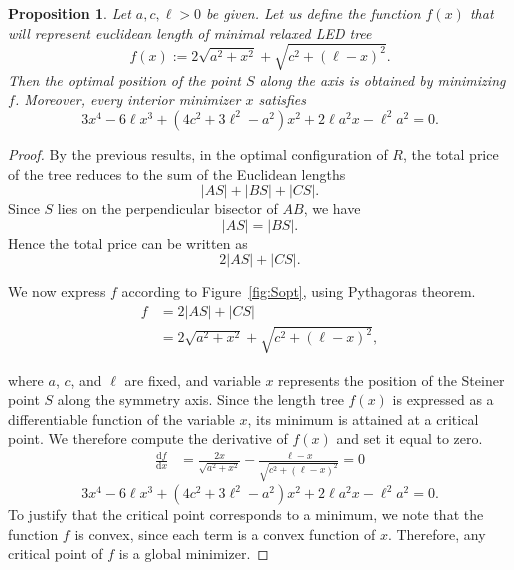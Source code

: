 \documentclass[openany]{book}
\newtheorem{proposition}{Proposition}
\begin{document}
		\begin{proposition}\label{prop:xSopt}
			Let \(a,c,\ell>0\) be given. Let us define the function \(f(x)\) that will represent euclidean length of minimal relaxed LED tree 
			\[
			f(x) := 2\sqrt{a^{2}+x^{2}}+\sqrt{c^{2}+(\ell-x)^{2}} .
			\]
			Then the optimal position of the point \(S\) along the axis is obtained by
			minimizing \(f\). Moreover, every interior minimizer \(x\) satisfies
			\begin{equation}\label{eq:xSpos}
				3x^{4} - 6\ell x^{3}
				+ \left(4c^{2} + 3\ell^{2} - a^{2}\right)x^{2}
				+ 2\ell a^{2}x
				- \ell^{2}a^{2}
				= 0 .
			\end{equation}
		\end{proposition}
	 	\begin{proof}
		 By the previous results, in the optimal configuration of \(R\), the total price of the tree reduces to the sum of the Euclidean lengths
		 \[
		 |AS|+|BS|+|CS|.
		 \]
		 Since \(S\) lies on the perpendicular bisector of \(AB\), we have
		 \[
		 |AS|=|BS|.
		 \]
		 Hence the total price can be written as
		 \[
		 2|AS|+|CS|.
		 \]
		
		We now express \(f\) according to Figure~\ref{fig:Sopt}, using Pythagoras theorem. 
		\begin{align*}
			f
			&= 2|AS| + |CS| \\
			&= 2\sqrt{a^{2} + x^{2}} + \sqrt{c^{2} + (\ell - x)^{2}} ,
		\end{align*}
		
		where \(a\), \(c\), and \(\ell\) are fixed, and variable \(x\) represents the position of the Steiner point \(S\) along the symmetry axis.
		Since the length tree \(f(x)\) is expressed as a differentiable function of the variable \(x\), its minimum is attained at a critical point. We therefore compute the derivative of \(f(x)\) and set it equal to zero.
		\begin{align*}
			\frac{\mathrm{d}f}{\mathrm{d}x}
			&= \frac{2x}{\sqrt{a^{2} + x^{2}}}
			- \frac{\ell - x}{\sqrt{c^{2} + (\ell - x)^{2}}} =0 
		\end{align*}
		\begin{equation}\label{eq:xSpos}
			3x^{4} - 6\ell x^{3}
			+ \left(4c^{2} + 3\ell^{2} - a^{2}\right)x^{2}
			+ 2\ell a^{2}x
			- \ell^{2}a^{2}
			= 0 .
		\end{equation}
		To justify that the critical point corresponds to a minimum, we note that the function \(f\) is convex, since each term is a convex function of \(x\).
		Therefore, any critical point of \(f\) is a global minimizer.
 		\end{proof}
 
\end{document}
